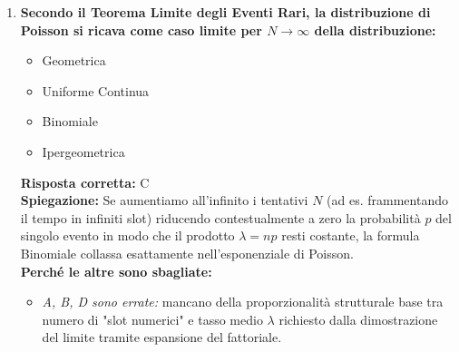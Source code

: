 \documentclass[12pt, a4paper]{article}
\begin{document}
\begin{enumerate}[label=\textbf{\arabic*.}]
    \item \textbf{Secondo il Teorema Limite degli Eventi Rari, la distribuzione di Poisson si ricava come caso limite per $N \to \infty$ della distribuzione:}
    \begin{itemize}
        \item[A)] Geometrica
        \item[B)] Uniforme Continua
        \item[C)] Binomiale
        \item[D)] Ipergeometrica
    \end{itemize}
    \textbf{Risposta corretta:} C \\
    \textbf{Spiegazione:} Se aumentiamo all'infinito i tentativi $N$ (ad es. frammentando il tempo in infiniti slot) riducendo contestualmente a zero la probabilità $p$ del singolo evento in modo che il prodotto $\lambda = np$ resti costante, la formula Binomiale collassa esattamente nell'esponenziale di Poisson. \\
    \textbf{Perché le altre sono sbagliate:}
    \begin{itemize}
        \item \textit{A, B, D sono errate:} mancano della proporzionalità strutturale base tra numero di "slot numerici" e tasso medio $\lambda$ richiesto dalla dimostrazione del limite tramite espansione del fattoriale.
    \end{itemize}
\end{enumerate}
\end{document}
